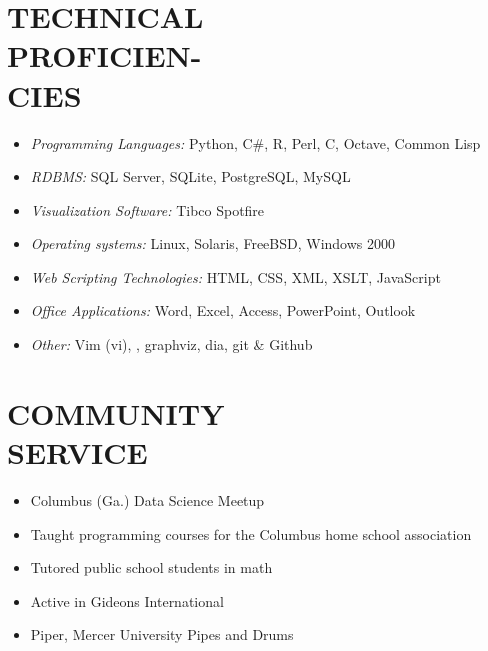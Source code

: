 \documentclass[margin, 10pt]{res} %
\begin{document}
\begin{resume}
\section{TECHNICAL\\ PROFICIEN-\\ CIES}

\begin{itemize} \itemsep -2pt %

\item {\it Programming Languages:} Python, C\#, \textsf{R}, Perl, C,  Octave, Common Lisp
\item {\it RDBMS:} SQL Server, SQLite, PostgreSQL, MySQL 
\item {\it Visualization Software:} Tibco Spotfire
\item {\it Operating systems:} Linux, Solaris, FreeBSD, Windows 2000
\item {\it Web Scripting Technologies:} HTML, CSS, XML, XSLT, JavaScript
\item {\it Office Applications:} Word, Excel, Access, PowerPoint, Outlook
\item {\it Other:} Vim (vi), \LaTeXe, graphviz, dia, git \& Github
\end{itemize}

 


\section{COMMUNITY \\ SERVICE}

\begin{itemize} \itemsep -2pt %
    \item Columbus (Ga.) Data Science Meetup
    \item Taught programming courses for the Columbus home school association
    \item Tutored public school students in math
    \item Active in Gideons International
    \item Piper, Mercer University Pipes and Drums
\end{itemize}


\end{resume}
\end{document}
